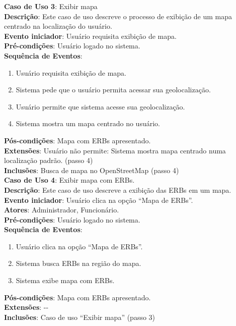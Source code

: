 \documentclass[]{politex}
\begin{document}
\noindent \textbf{Caso de Uso 3}: Exibir mapa \\
\textbf{Descrição}: Este caso de uso descreve o processo de exibição de um mapa centrado na localização do usuário. \\
\textbf{Evento iniciador}: Usuário requisita exibição de mapa. \\
\textbf{Pré-condições}: Usuário logado no sistema. \\
\textbf{Sequência de Eventos}:
\begin{enumerate}
\item Usuário requisita exibição de mapa.
\item Sistema pede que o usuário permita acessar sua geolocalização.
\item Usuário permite que sistema acesse sua geolocalização.
\item Sistema mostra um mapa centrado no usuário.
\end{enumerate}
\textbf{Pós-condições}: Mapa com ERBs apresentado. \\
\textbf{Extensões}: Usuário não permite: Sistema mostra mapa centrado numa localização padrão. (passo 4) \\
\textbf{Inclusões}: Busca de mapa no OpenStreetMap (passo 4) \\

\noindent \textbf{Caso de Uso 4}: Exibir mapa com ERBs. \\
\textbf{Descrição}: Este caso de uso descreve a exibição das ERBs em um mapa. \\
\textbf{Evento iniciador}: Usuário clica na opção ``Mapa de ERBs''. \\
\textbf{Atores}: Administrador, Funcionário. \\
\textbf{Pré-condições}: Usuário logado no sistema. \\
\textbf{Sequência de Eventos}:
\begin{enumerate}
\item Usuário clica na opção ``Mapa de ERBs''.
\item Sistema busca ERBs na região do mapa.
\item Sistema exibe mapa com ERBs.
\end{enumerate}
\textbf{Pós-condições}: Mapa com ERBs apresentado. \\
\textbf{Extensões}: -{}- \\
\textbf{Inclusões}: Caso de uso ``Exibir mapa'' (passo 3) \\
\end{document}

